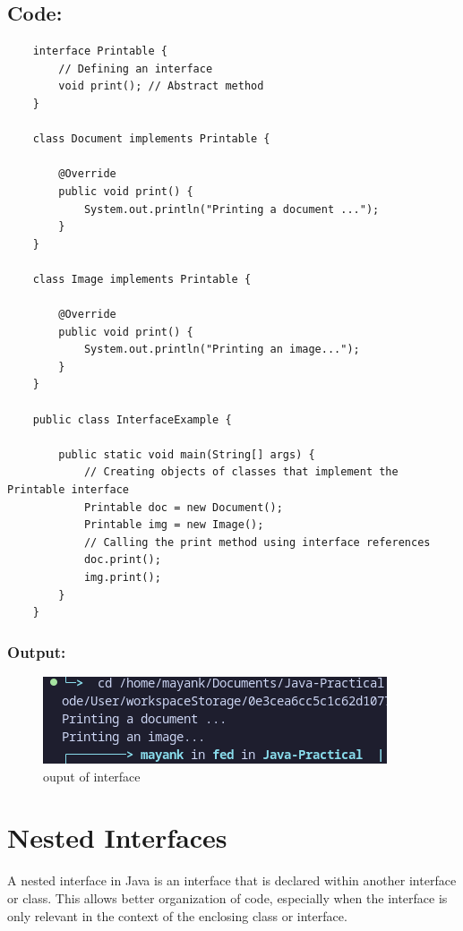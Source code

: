 \documentclass[a4paper,12pt]{article}
\begin{document}
\subsection{Code: }
\begin{lstlisting}
    interface Printable {
        // Defining an interface 
        void print(); // Abstract method
    }
    
    class Document implements Printable {
    
        @Override
        public void print() {
            System.out.println("Printing a document ...");
        }
    }
    
    class Image implements Printable {
    
        @Override
        public void print() {
            System.out.println("Printing an image...");
        }
    }
    
    public class InterfaceExample {
    
        public static void main(String[] args) {
            // Creating objects of classes that implement the Printable interface
            Printable doc = new Document();
            Printable img = new Image();
            // Calling the print method using interface references
            doc.print();
            img.print();
        }
    }
\end{lstlisting}
\subsubsection{Output: }
\begin{figure}[H]
    \centering
    \includegraphics[width=0.9\linewidth]{images/Interface.png}
    \caption{ouput of interface}
    \label{fig:sample_image}
\end{figure}

\section{Nested Interfaces}
A nested interface in Java is an interface that is declared within another interface or
class. This allows better organization of code, especially when the interface is only
relevant in the context of the enclosing class or interface.
\end{document}
